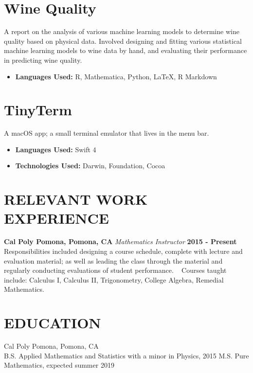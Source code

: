 \documentclass[margin]{../res}
\begin{document}
\begin{resume}
\normalsize{\section{Wine Quality}}
A report on the analysis of various machine learning models to determine wine
quality based on physical data.
Involved designing and fitting various statistical machine learning models to
wine data by hand, and
evaluating their performance in predicting wine quality.
\begin{itemize}
\item {\bf Languages Used: }\newline R, Mathematica, Python, LaTeX, R Markdown
\end{itemize}

\normalsize{\section{TinyTerm}} A macOS app; a small terminal emulator that
lives in the menu bar.
\begin{multicols}{2}
\begin{itemize}
\item {\bf Languages Used: } \newline Swift 4
  \columnbreak
\item {\bf Technologies Used: } \newline Darwin, Foundation, Cocoa
\end{itemize}
\end{multicols}

\section{RELEVANT WORK EXPERIENCE}
{\bf Cal Poly Pomona, Pomona, CA}\newline
{\it Mathematics Instructor}\newline
{\bf 2015 - Present}\newline
Responsibilities included designing a course schedule, complete with lecture and
evaluation material; as well as leading the class through the material and
regularly conducting evaluations of student performance.\newline
\ \newline
Courses taught include: Calculus I, Calculus II, Trigonometry, College Algebra,
Remedial Mathematics.

\section{EDUCATION}
Cal Poly Pomona, Pomona, CA \\
B.S. Applied Mathematics and Statistics with a minor in Physics, 2015 \newline
M.S. Pure Mathematics, expected summer 2019


\end{resume}
\end{document}
